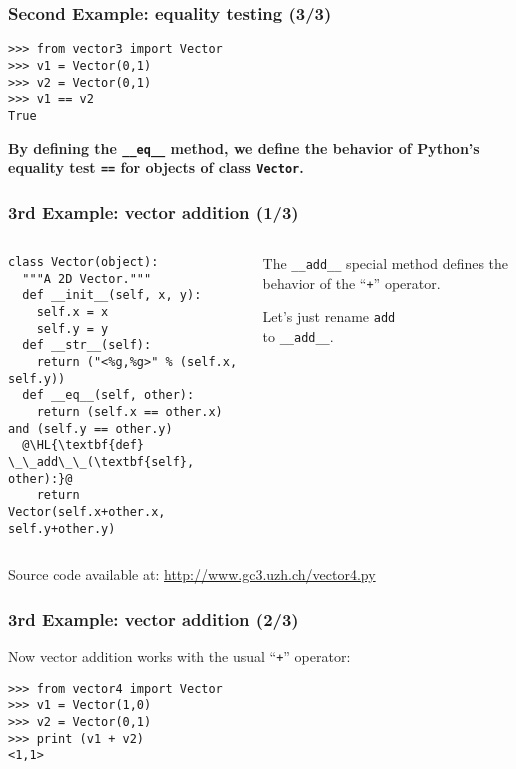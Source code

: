 \documentclass[english,serif,mathserif,xcolor=pdftex,dvipsnames,table]{beamer}
\begin{document}
\begin{frame}[fragile]
  \frametitle{Second Example: equality testing (3/3)}
\begin{lstlisting}
>>> from vector3 import Vector
>>> v1 = Vector(0,1)
>>> v2 = Vector(0,1)
>>> v1 == v2
True
\end{lstlisting}

  \+ {\bfseries By defining the \lstinline|__eq__| method, we
    define the behavior of Python's equality test \lstinline|==| for
    objects of class \texttt{Vector}.}
\end{frame}


\begin{frame}[fragile]
  \frametitle{3rd Example: vector addition (1/3)}
  \begin{columns}[t]
    \begin{column}{0.5\textwidth}
\begin{lstlisting}
class Vector(object):
  """A 2D Vector."""
  def __init__(self, x, y):
    self.x = x
    self.y = y
  def __str__(self):
    return ("<%g,%g>" % (self.x, self.y))
  def __eq__(self, other):
    return (self.x == other.x) and (self.y == other.y)
  @\HL{\textbf{def} \_\_add\_\_(\textbf{self}, other):}@
    return Vector(self.x+other.x, self.y+other.y)
\end{lstlisting}
    \end{column}
    \begin{column}{0.5\textwidth}
      \raggedleft
      The \lstinline|__add__| special method defines the behavior of the
      ``\texttt{+}'' operator.

      \+
      Let's just rename \texttt{add} \\ to \texttt{\_\_add\_\_}.
    \end{column}
  \end{columns}

  \+
  {\scriptsize Source code available at:
    \url{http://www.gc3.uzh.ch/vector4.py}}
\end{frame}


\begin{frame}[fragile]
  \frametitle{3rd Example: vector addition (2/3)}

  Now vector addition works with the usual ``\texttt{+}'' operator:
\begin{lstlisting}
>>> from vector4 import Vector
>>> v1 = Vector(1,0)
>>> v2 = Vector(0,1)
>>> print (v1 + v2)
<1,1>
\end{lstlisting}
\end{frame}
\end{document}
